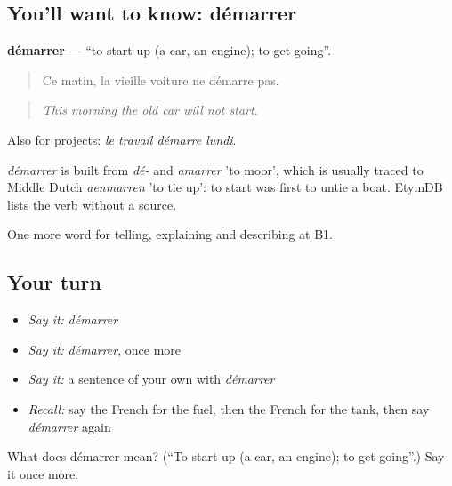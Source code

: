 \subsection*{You'll want to know: démarrer}
\textbf{démarrer} — \textquotedblleft{}to start up (a car, an engine); to get going\textquotedblright{}.

\begin{quote}
Ce matin, la vieille voiture ne démarre pas.
\end{quote}

\begin{quote}
\emph{This morning the old car will not start.}
\end{quote}

Also for projects: \emph{le travail démarre lundi}.

\begin{cousinweb}
\emph{démarrer} is built from \emph{dé-} and \emph{amarrer} 'to moor', which is usually traced to Middle Dutch \emph{aenmarren} 'to tie up': to start was first to untie a boat. EtymDB lists the verb without a source.
\end{cousinweb}

\begin{grammarlens}[title={What you've built}]
One more word for telling, explaining and describing at B1.
\end{grammarlens}

\subsection*{Your turn}
\begin{itemize}
\raggedright
  \item \emph{Say it:} \emph{démarrer}
  \item \emph{Say it:} \emph{démarrer}, once more
  \item \emph{Say it:} a sentence of your own with \emph{démarrer}
  \item \emph{Recall:} say the French for the fuel, then the French for the tank, then say \emph{démarrer} again
\end{itemize}

\begin{tcolorbox}[breakable,colback=teal!4,colframe=teal!35!black,title={Before you move on}]
What does démarrer mean? (\textquotedblleft{}To start up (a car, an engine); to get going\textquotedblright{}.) Say it once more.
\end{tcolorbox}
